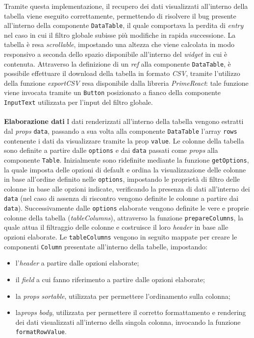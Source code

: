 Tramite questa implementazione, il recupero dei dati visualizzati all'interno della tabella viene eseguito correttamente, permettendo di risolvere
il bug presente all'interno della componente \texttt{DataTable}, il quale comportava la perdita di \textit{entry} nel caso in cui il filtro globale subisse
più modifiche in rapida successione. \newline
La tabella è resa \textit{scrollable}, impostando una altezza che viene calcolata in modo responsivo a seconda dello spazio disponibile
all'interno del \textit{widget} in cui è contenuta. \newline
Attraverso la definizione di un \textit{ref} alla componente \texttt{DataTable}, è possibile effettuare il download della tabella in formato
\textit{CSV}, tramite l'utilizzo della funzione \textit{exportCSV} resa disponibile dalla libreria \textit{PrimeReact}: tale funzione viene
invocata tramite un \texttt{Button} posizionato a fianco della componente \texttt{InputText} utilizzata per l'input del filtro globale. \\
\\
\textbf{Elaborazione dati}\newline
I dati renderizzati all'interno della tabella vengono estratti dal \textit{props} \texttt{data}, passando a sua volta alla componente \texttt{DataTable}
l'array \texttt{rows} contenente i dati da visualizzare tramite la prop \texttt{value}. \newline
Le colonne della tabella sono definite a partire dalle \texttt{options} e dai \texttt{data} passati come \textit{props} alla componente \texttt{Table}.
Inizialmente sono ridefinite mediante la funzione \texttt{getOptions}, la quale imposta delle opzioni di default e ordina la visualizzazione delle colonne
in base all'ordine definito nelle \texttt{options}, impostando le proprietà di filtro delle colonne in base alle opzioni indicate, verificando la presenza
di dati all'interno dei \texttt{data} (nel caso di assenza di riscontro vengono definite le colonne a partire dai \texttt{data}).
Successivamente dalle \texttt{options} elaborate vengono definite le vere e proprie colonne della tabella (\textit{tableColumns}), attraverso la funzione \texttt{prepareColumns},
la quale attua il filtraggio delle colonne e costruisce il loro \textit{header} in base alle opzioni elaborate. \newline
Le \texttt{tableColumns} vengono in seguito mappate per creare le componenti \texttt{Column} presentate all'interno della tabelle, impostando:
\begin{itemize}
    \item l'\textit{header} a partire dalle opzioni elaborate;
    \item il \textit{field} a cui fanno riferimento a partire dalle opzioni elaborate;
    \item la \textit{props} \textit{sortable}, utilizzata per permettere l'ordinamento sulla colonna;
    \item la\textit{props} \textit{body}, utilizzata per permettere il corretto formattamento e rendering dei dati visualizzati all'interno della singola colonna,
          invocando la funzione \texttt{formatRowValue}.
\end{itemize}
